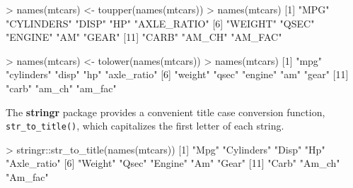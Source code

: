 \documentclass[
]{book}
\newenvironment{Shaded}{\begin{snugshade}}{\end{snugshade}}
\newcommand{\DecValTok}[1]{\textcolor[rgb]{0.00,0.00,0.81}{#1}}
\newcommand{\FunctionTok}[1]{\textcolor[rgb]{0.00,0.00,0.00}{#1}}
\newcommand{\NormalTok}[1]{#1}
\newcommand{\OtherTok}[1]{\textcolor[rgb]{0.56,0.35,0.01}{#1}}
\newcommand{\SpecialCharTok}[1]{\textcolor[rgb]{0.00,0.00,0.00}{#1}}
\newcommand{\StringTok}[1]{\textcolor[rgb]{0.31,0.60,0.02}{#1}}
\begin{document}
\begin{Shaded}
\begin{Highlighting}[]
\SpecialCharTok{\textgreater{}} \FunctionTok{names}\NormalTok{(mtcars) }\OtherTok{\textless{}{-}} \FunctionTok{toupper}\NormalTok{(}\FunctionTok{names}\NormalTok{(mtcars))}
\SpecialCharTok{\textgreater{}} \FunctionTok{names}\NormalTok{(mtcars)}
\NormalTok{ [}\DecValTok{1}\NormalTok{] }\StringTok{"MPG"}        \StringTok{"CYLINDERS"}  \StringTok{"DISP"}       \StringTok{"HP"}         \StringTok{"AXLE\_RATIO"}
\NormalTok{ [}\DecValTok{6}\NormalTok{] }\StringTok{"WEIGHT"}     \StringTok{"QSEC"}       \StringTok{"ENGINE"}     \StringTok{"AM"}         \StringTok{"GEAR"}      
\NormalTok{[}\DecValTok{11}\NormalTok{] }\StringTok{"CARB"}       \StringTok{"AM\_CH"}      \StringTok{"AM\_FAC"}    
\end{Highlighting}
\end{Shaded}

\begin{Shaded}
\begin{Highlighting}[]
\SpecialCharTok{\textgreater{}} \FunctionTok{names}\NormalTok{(mtcars) }\OtherTok{\textless{}{-}} \FunctionTok{tolower}\NormalTok{(}\FunctionTok{names}\NormalTok{(mtcars))}
\SpecialCharTok{\textgreater{}} \FunctionTok{names}\NormalTok{(mtcars)}
\NormalTok{ [}\DecValTok{1}\NormalTok{] }\StringTok{"mpg"}        \StringTok{"cylinders"}  \StringTok{"disp"}       \StringTok{"hp"}         \StringTok{"axle\_ratio"}
\NormalTok{ [}\DecValTok{6}\NormalTok{] }\StringTok{"weight"}     \StringTok{"qsec"}       \StringTok{"engine"}     \StringTok{"am"}         \StringTok{"gear"}      
\NormalTok{[}\DecValTok{11}\NormalTok{] }\StringTok{"carb"}       \StringTok{"am\_ch"}      \StringTok{"am\_fac"}    
\end{Highlighting}
\end{Shaded}

The \textbf{stringr} package provides a convenient title case conversion function, \texttt{str\_to\_title()}, which capitalizes the first letter of each string.

\begin{Shaded}
\begin{Highlighting}[]
\SpecialCharTok{\textgreater{}}\NormalTok{ stringr}\SpecialCharTok{::}\FunctionTok{str\_to\_title}\NormalTok{(}\FunctionTok{names}\NormalTok{(mtcars))}
\NormalTok{ [}\DecValTok{1}\NormalTok{] }\StringTok{"Mpg"}        \StringTok{"Cylinders"}  \StringTok{"Disp"}       \StringTok{"Hp"}         \StringTok{"Axle\_ratio"}
\NormalTok{ [}\DecValTok{6}\NormalTok{] }\StringTok{"Weight"}     \StringTok{"Qsec"}       \StringTok{"Engine"}     \StringTok{"Am"}         \StringTok{"Gear"}      
\NormalTok{[}\DecValTok{11}\NormalTok{] }\StringTok{"Carb"}       \StringTok{"Am\_ch"}      \StringTok{"Am\_fac"}    
\end{Highlighting}
\end{Shaded}
\end{document}
